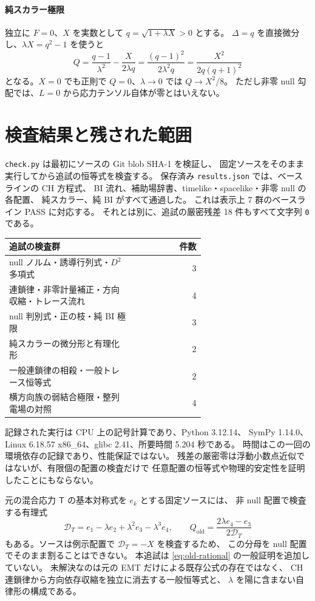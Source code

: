 \documentclass[11pt,a4paper]{article}
\newcommand{\Tmix}{\mathsf{T}}
\begin{document}
\paragraph{純スカラー極限}
独立に $F=0$、$X$ を実数として $q=\sqrt{1+\lambda X}>0$ とする。
$\Delta=q$ を直接微分し、$\lambda X=q^2-1$ を使うと
\begin{equation}\label{eq:scalar}
Q=\frac{q-1}{\lambda^2}-\frac{X}{2\lambda q}
=\frac{(q-1)^2}{2\lambda^2q}
=\frac{X^2}{2q(q+1)^2}
\end{equation}
となる。$X=0$ でも正則で $Q=0$、$\lambda\to0$ では $Q\to X^2/8$。
ただし非零 null 勾配では、$L=0$ から応力テンソル自体が零とはいえない。

\newpage
\section{検査結果と残された範囲}
\texttt{check.py} は最初にソースの Git blob SHA-1 を検証し、
固定ソースをそのまま実行してから追試の恒等式を検査する。
保存済み \texttt{results.json} では、ベースラインの CH 方程式、
BI 流れ、補助場辞書、timelike・spacelike・非零 null の各配置、
純スカラー、純 BI がすべて通過した。
これは表示上 7 群のベースライン PASS に対応する。
それとは別に、追試の厳密残差 18 件もすべて文字列 \texttt{0} である。

\begin{center}
\small
\begin{tabular}{@{}p{0.64\linewidth}r@{}}
\toprule
追試の検査群 & 件数\\
\midrule
null ノルム・誘導行列式・$D^2$ 多項式 & 3\\
連鎖律・非零計量補正・方向収縮・トレース流れ & 4\\
null 判別式・正の枝・純 BI 極限 & 3\\
純スカラーの微分形と有理化形 & 2\\
一般連鎖律の相殺・一般トレース恒等式 & 2\\
横方向族の弱結合極限・整列電場の対照 & 4\\
\bottomrule
\end{tabular}
\end{center}

記録された実行は CPU 上の記号計算であり、Python 3.12.14、
SymPy 1.14.0、Linux 6.18.57 x86\_64、glibc 2.41、所要時間 5.204 秒である。
時間はこの一回の環境依存の記録であり、性能保証ではない。
残差の厳密零は浮動小数点近似ではないが、有限個の配置の検査だけで
任意配置の恒等式や物理的安定性を証明したことにもならない。

元の混合応力 $\Tmix$ の基本対称式を $e_k$ とする固定ソースには、
非 null 配置で検査する有理式
\begin{equation}\label{eq:old-rational}
\mathcal D_T=e_1-\lambda e_2+\lambda^2e_3-\lambda^3e_4,
\qquad Q_{\mathrm{old}}=\frac{2\lambda e_4-e_3}{2\mathcal D_T}
\end{equation}
もある。ソースは例示配置で $\mathcal D_T=-X$ を検査するため、
この分母を null 配置でそのまま割ることはできない。
本追試は \eqref{eq:old-rational} の一般証明を追加していない。
未解決なのは元の EMT だけによる既存公式の存在ではなく、
CH 連鎖律から方向依存収縮を独立に消去する一般恒等式と、
$\lambda$ を陽に含まない自律形の構成である。
\end{document}
